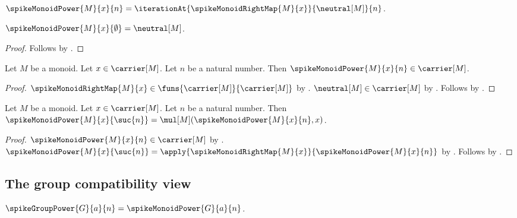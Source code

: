 \begin{definition}\label{spike16_monoid_power}
    $\spikeMonoidPower{M}{x}{n}=
        \iterationAt{\spikeMonoidRightMap{M}{x}}{\neutral[M]}{n}$.
\end{definition}

\begin{proposition}\label{spike16_monoid_power_zero}
    $\spikeMonoidPower{M}{x}{\emptyset}=\neutral[M]$.
\end{proposition}
\begin{proof}
    Follows by
        .
\end{proof}

\begin{proposition}\label{spike16_monoid_power_type}
    Let $M$ be a monoid.
    Let $x\in\carrier[M]$.
    Let $n$ be a natural number.
    Then $\spikeMonoidPower{M}{x}{n}\in\carrier[M]$.
\end{proposition}
\begin{proof}
    $\spikeMonoidRightMap{M}{x}\in
        \funs{\carrier[M]}{\carrier[M]}$
        by .
    $\neutral[M]\in\carrier[M]$ by
        .
    Follows by
        .
\end{proof}

\begin{proposition}\label{spike16_monoid_power_successor}
    Let $M$ be a monoid.
    Let $x\in\carrier[M]$.
    Let $n$ be a natural number.
    Then $\spikeMonoidPower{M}{x}{\suc{n}}
        =\mul[M](\spikeMonoidPower{M}{x}{n},x)$.
\end{proposition}
\begin{proof}
    $\spikeMonoidPower{M}{x}{n}\in\carrier[M]$
        by .
    $\spikeMonoidPower{M}{x}{\suc{n}}
        =\apply{\spikeMonoidRightMap{M}{x}}{\spikeMonoidPower{M}{x}{n}}$
        by .
    Follows by .
\end{proof}

\subsection{The group compatibility view}

\begin{definition}\label{spike16_group_power_body}
    $\spikeGroupPower{G}{a}{n}=\spikeMonoidPower{G}{a}{n}$.
\end{definition}


